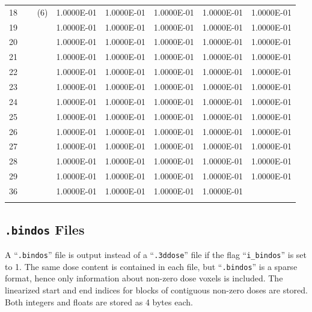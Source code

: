 \documentclass[12pt,twoside]{article}      %
\newcommand{\indexm}[1]{\index{#1}}
\begin{document}
\begin{table}[htbp]
\begin{center}
\begin{tabular}[t]{||p{1.5cm}|p{2.5cm}|p{2.5cm}|p{2.5cm}|p{2.5cm}|p{2.5cm}||}
18 ~~~~(6)    & 1.0000E-01    & 1.0000E-01    & 1.0000E-01    & 1.0000E-01 & 1.0000E-01   \\
19 & 1.0000E-01    & 1.0000E-01    & 1.0000E-01 & 1.0000E-01    & 1.0000E-01  \\
20  & 1.0000E-01    & 1.0000E-01 &  1.0000E-01    & 1.0000E-01    & 1.0000E-01   \\
21 & 1.0000E-01 & 1.0000E-01    & 1.0000E-01    & 1.0000E-01    & 1.0000E-01 \\
22    & 1.0000E-01    & 1.0000E-01    & 1.0000E-01    & 1.0000E-01 & 1.0000E-01   \\
23 & 1.0000E-01    & 1.0000E-01    & 1.0000E-01 &  1.0000E-01    & 1.0000E-01   \\
24 & 1.0000E-01    & 1.0000E-01 & 1.0000E-01    & 1.0000E-01    & 1.0000E-01   \\
25 & 1.0000E-01  &  1.0000E-01    & 1.0000E-01    & 1.0000E-01    & 1.0000E-01 \\
26    & 1.0000E-01    & 1.0000E-01    & 1.0000E-01    & 1.0000E-01 &  1.0000E-01   \\
27 & 1.0000E-01    & 1.0000E-01    & 1.0000E-01 &  1.0000E-01    & 1.0000E-01   \\
28 & 1.0000E-01    & 1.0000E-01 & 1.0000E-01    & 1.0000E-01    & 1.0000E-01    \\
29 & 1.0000E-01 &  1.0000E-01    & 1.0000E-01    & 1.0000E-01    & 1.0000E-01  \\
36    & 1.0000E-01    & 1.0000E-01    & 1.0000E-01    & 1.0000E-01 & \\
& & & & & \\
\hline\hline
\end{tabular}
\end{center}
\end{table}
\normalsize

\lfoot[]{}

\subsection{{\tt .bindos} Files}
\label{subsec:bindos_format}
\indexm{.bindos}
\indexm{files!.bindos}
A ``{\tt .bindos}'' file is output instead of a ``{\tt .3ddose}'' file if the
flag ``{\tt i\_bindos}'' is set to 1. The same dose content is contained in each file,
but ``{\tt .bindos}'' is a sparse format, hence only information about non-zero dose
voxels is included. The linearized start and end indices for blocks of contiguous non-zero
doses are stored. Both integers and floats are stored as 4 bytes each.
\end{document}
